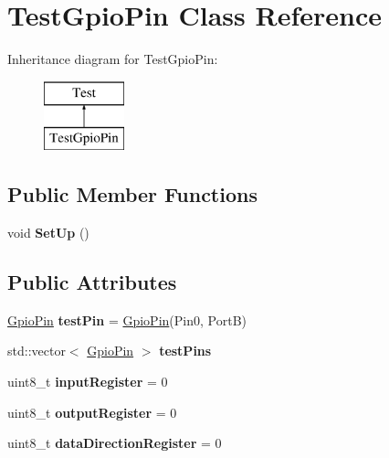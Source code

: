 \hypertarget{class_test_gpio_pin}{}\section{Test\+Gpio\+Pin Class Reference}
\label{class_test_gpio_pin}
Inheritance diagram for Test\+Gpio\+Pin\+:\begin{figure}[H]
\begin{center}
\leavevmode
\includegraphics[height=2.000000cm]{class_test_gpio_pin}
\end{center}
\end{figure}
\subsection*{Public Member Functions}
\begin{DoxyCompactItemize}
\item 
\mbox{\label{class_test_gpio_pin_a16dac6c5fc1a9d2a192e9ece77e68e08}} 
void {\bfseries Set\+Up} ()
\end{DoxyCompactItemize}
\subsection*{Public Attributes}
\begin{DoxyCompactItemize}
\item 
\mbox{\label{class_test_gpio_pin_abfdc244ab65eef13ffe89867e360dcb1}} 
\mbox{\hyperlink{class_gpio_pin}{Gpio\+Pin}} {\bfseries test\+Pin} = \mbox{\hyperlink{class_gpio_pin}{Gpio\+Pin}}(Pin0, PortB)
\item 
std\+::vector$<$ \mbox{\hyperlink{class_gpio_pin}{Gpio\+Pin}} $>$ {\bfseries test\+Pins}
\item 
\mbox{\label{class_test_gpio_pin_a8624b302e310f70ff1d836765ac70d42}} 
uint8\+\_\+t {\bfseries input\+Register} = 0
\item 
\mbox{\label{class_test_gpio_pin_a14d28ad10e22bc6ad548e967a7ba8cdf}} 
uint8\+\_\+t {\bfseries output\+Register} = 0
\item 
\mbox{\label{class_test_gpio_pin_ac17d157baca46eaede873ce26bd766fc}} 
uint8\+\_\+t {\bfseries data\+Direction\+Register} = 0
\end{DoxyCompactItemize}



